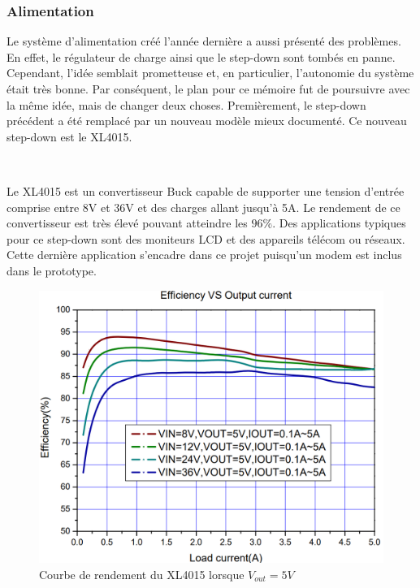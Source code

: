 \subsubsection{Alimentation}

\noindent
Le système d'alimentation créé l'année dernière a aussi présenté des problèmes. En effet, le régulateur de charge ainsi que le step-down sont tombés en panne. Cependant, l'idée semblait prometteuse et, en particulier, l'autonomie du système était très bonne. Par conséquent, le plan pour ce mémoire fut de poursuivre avec la même idée, mais de changer deux choses. Premièrement, le step-down précédent a été remplacé par un nouveau modèle mieux documenté. Ce nouveau step-down est le XL4015.

~

\noindent
Le XL4015 est un convertisseur Buck capable de supporter une tension d'entrée comprise entre 8V et 36V et des charges allant jusqu'à 5A. Le rendement de ce convertisseur est très élevé pouvant atteindre les $96\%$. Des applications typiques pour ce step-down sont des moniteurs LCD et des appareils télécom ou réseaux. Cette dernière application s'encadre dans ce projet puisqu'un modem est inclus dans le prototype.


\begin{figure}[ht!]
  \centering
  \includegraphics[scale=0.4]{img/el_prototype/rendement.png}
  \caption{Courbe de rendement du XL4015 lorsque $V_{out} = 5V$ \cite{xl4015_datasheet}}
  \label{fig:xlrend}
\end{figure}
~

